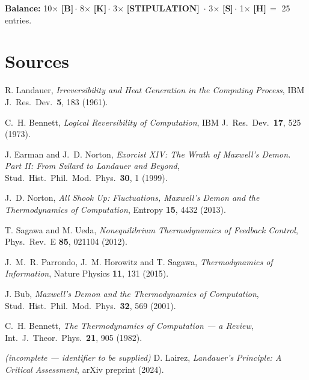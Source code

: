 \documentclass[11pt,a4paper]{article}
\newcommand{\LS}{\textcolor{laySet}{\textbf{\footnotesize\textsf{[STIPULATION]}}}\,}
\newcommand{\LK}{\textcolor{layK}{\textbf{\footnotesize\textsf{[K]}}}\,}
\newcommand{\LB}{\textcolor{layB}{\textbf{\footnotesize\textsf{[B]}}}\,}
\newcommand{\LSk}{\textcolor{layS}{\textbf{\footnotesize\textsf{[S]}}}\,}
\newcommand{\LH}{\textcolor{layH}{\textbf{\footnotesize\textsf{[H]}}}\,}
\theoremstyle{ffgft}
\begin{document}
\textbf{Balance:} 10$\times$ \LB $\cdot$ 8$\times$ \LK $\cdot$ 3$\times$ \LS
$\cdot$ 3$\times$ \LSk $\cdot$ 1$\times$ \LH $=$ 25 entries.

\clearpage
{}
{}
\section*{Sources}

\begingroup
\small
\begin{description}[leftmargin=3.2em,style=sameline,itemsep=0.3em]

\item[{[B1]}] R. Landauer, \emph{Irreversibility and Heat Generation in the
Computing Process}, IBM J.\ Res.\ Dev.\ \textbf{5}, 183 (1961).

\item[{[B2]}] C.~H. Bennett, \emph{Logical Reversibility of Computation}, IBM J.\
Res.\ Dev.\ \textbf{17}, 525 (1973).

\item[{[B3]}] J. Earman and J.~D. Norton, \emph{Exorcist XIV: The Wrath of
Maxwell's Demon. Part II: From Szilard to Landauer and Beyond}, Stud.\ Hist.\
Phil.\ Mod.\ Phys.\ \textbf{30}, 1 (1999).

\item[{[B4]}] J.~D. Norton, \emph{All Shook Up: Fluctuations, Maxwell's Demon and
the Thermodynamics of Computation}, Entropy \textbf{15}, 4432 (2013).

\item[{[B5]}] T. Sagawa and M. Ueda, \emph{Nonequilibrium Thermodynamics of
Feedback Control}, Phys.\ Rev.\ E \textbf{85}, 021104 (2012).

\item[{[B6]}] J.~M.~R. Parrondo, J.~M. Horowitz and T. Sagawa,
\emph{Thermodynamics of Information}, Nature Physics \textbf{11}, 131 (2015).

\item[{[B7]}] J. Bub, \emph{Maxwell's Demon and the Thermodynamics of
Computation}, Stud.\ Hist.\ Phil.\ Mod.\ Phys.\ \textbf{32}, 569 (2001).

\item[{[B8]}] C.~H. Bennett, \emph{The Thermodynamics of Computation --- a
Review}, Int.\ J.\ Theor.\ Phys.\ \textbf{21}, 905 (1982).

\item[{[B9]}] \emph{(incomplete --- identifier to be supplied)} D. Lairez,
\emph{Landauer's Principle: A Critical Assessment}, arXiv preprint (2024).


\end{description}
\end{document}
